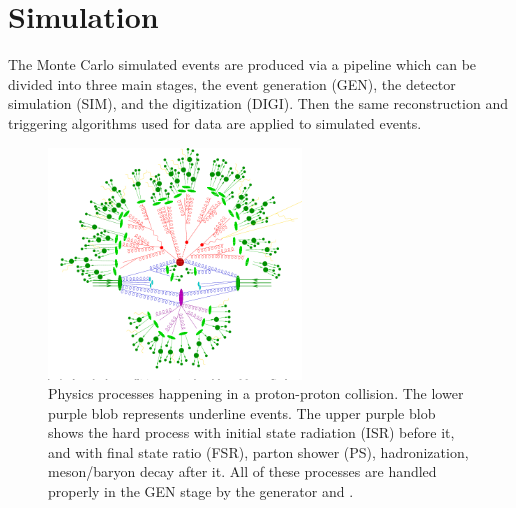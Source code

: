 
\section{Simulation}
\label{sec:cmsexperiment:simulation}



The Monte Carlo simulated events are produced via a pipeline which can be divided into three main stages, the event generation (GEN), the detector simulation (SIM), and the digitization (DIGI). Then the same reconstruction and triggering algorithms used for data are applied to simulated events.


\begin{figure}[ht]
    \centering
    \includegraphics[trim={0 0.1cm 0 0}, clip, width=0.6\textwidth]{chapters/CMSExperiment/sectionMCSimulation/figures/ps.png}
    \caption{Physics processes happening in a proton-proton collision. The lower purple blob represents underline events. The upper purple blob shows the hard process with initial state radiation (ISR) before it, and with final state ratio (FSR), parton shower (PS), hadronization, meson/baryon decay after it. All of these processes are handled properly in the GEN stage by the generator and \PYTHIA. }
    \label{fig:cmsexperiment:simulation:collision}
\end{figure}


